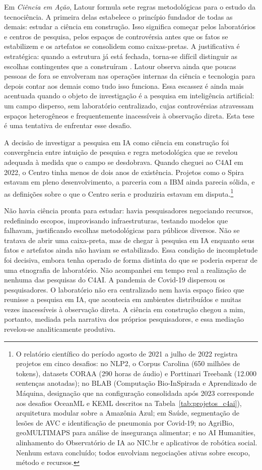 Em \textit{Ciência em Ação}, Latour formula sete regras metodológicas para o estudo da tecnociência. A primeira delas estabelece o princípio fundador de todas as demais: estudar a ciência em construção. Isso significa começar pelos laboratórios e centros de pesquisa, pelos espaços de controvérsia antes que os fatos se estabilizem e os artefatos se consolidem como caixas-pretas. A justificativa é estratégica: quando a estrutura já está fechada, torna-se difícil distinguir as escolhas contingentes que a construíram \parencite{Latour2011CienciaEmAcao}. Latour observa ainda que poucas pessoas de fora se envolveram nas operações internas da ciência e tecnologia para depois contar aos demais como tudo isso funciona. Essa escassez é ainda mais acentuada quando o objeto de investigação é a pesquisa em inteligência artificial: um campo disperso, sem laboratório centralizado, cujas controvérsias atravessam espaços heterogêneos e frequentemente inacessíveis à observação direta. Esta tese é uma tentativa de enfrentar esse desafio.

A decisão de investigar a pesquisa em IA como ciência em construção foi convergência entre intuição de pesquisa e regra metodológica que se revelou adequada à medida que o campo se desdobrava. Quando cheguei ao C4AI em 2022, o Centro tinha menos de dois anos de existência. Projetos como o Spira estavam em pleno desenvolvimento, a parceria com a IBM ainda parecia sólida, e as definições sobre o que o Centro seria e produziria estavam em disputa.\footnote{O relatório científico do período agosto de 2021 a julho de 2022 registra projetos em cinco desafios: no NLP2, o Corpus Carolina (650 milhões de tokens), datasets CORAA (290 horas de áudio) e Porttinari Treebank (12.000 sentenças anotadas); no BLAB (Computação Bio-InSpirada e Aprendizado de Máquina, designação que na configuração consolidada após 2023 corresponde aos desafios OceanML e KEML descritos na Tabela~\ref{tab:projetos_c4ai}), arquitetura modular sobre a Amazônia Azul; em Saúde, segmentação de lesões de AVC e identificação de pneumonia por Covid-19; no AgriBio, geoMULTIMAPS para análise de insegurança alimentar; e no AI Humanities, alinhamento do Observatório de IA ao NIC.br e aplicativos de robótica social. Nenhum estava concluído; todos envolviam negociações ativas sobre escopo, método e recursos.} 

Não havia ciência pronta para estudar: havia pesquisadores negociando recursos, redefinindo escopos, improvisando infraestruturas, testando modelos que falhavam, justificando escolhas metodológicas para públicos diversos. Não se tratava de abrir uma caixa-preta, mas de chegar à pesquisa em IA enquanto seus fatos e artefatos ainda não haviam se estabilizado. Essa condição de incompletude foi decisiva, embora tenha operado de forma distinta do que se poderia esperar de uma etnografia de laboratório. Não acompanhei em tempo real a realização de nenhuma das pesquisas do C4AI. A pandemia de Covid-19 dispersou os pesquisadores. O laboratório não era centralizado nem havia espaço físico que reunisse a pesquisa em IA, que acontecia em ambientes distribuídos e muitas vezes inacessíveis à observação direta. A ciência em construção chegou a mim, portanto, mediada pela narrativa dos próprios pesquisadores, e essa mediação revelou-se analiticamente produtiva.


